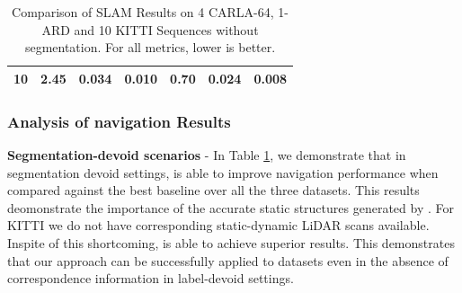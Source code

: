 \begin{table}[t]
\begin{tabular}{|ccccccc|}
\multicolumn{1}{|c|}{10}         & \multicolumn{1}{c|}{2.45}        & \multicolumn{1}{c|}{0.034}            & \multicolumn{1}{c|}{0.010}                & \multicolumn{1}{c|}{\textbf{0.70}}  & \multicolumn{1}{c|}{\textbf{0.024}} & \textbf{0.008}              \\ \hline
\end{tabular}
\caption{Comparison of SLAM Results on 4 CARLA-64, 1-ARD and 10 KITTI Sequences without segmentation. For all metrics, lower is better.}
\label{tab:slamresults}
\end{table}




 \subsubsection{Analysis of navigation Results}

\textbf{Segmentation-devoid scenarios} - In Table \ref{tab:slamresults}, we demonstrate that in segmentation devoid settings, \dslr{} is able to improve navigation performance when compared against the best baseline over all the three datasets. This results deomonstrate the importance of the accurate static structures generated by \dslr{}. For KITTI we do not have corresponding static-dynamic LiDAR scans available. Inspite of this shortcoming, \dslruda{} is able to achieve superior results. This demonstrates that our approach can be successfully applied to datasets even in the absence of  correspondence information in label-devoid settings.


